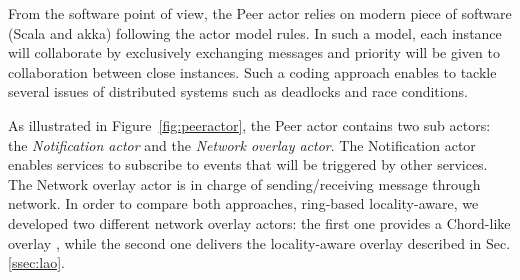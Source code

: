 From the software point of view, the Peer actor relies on modern piece of software (Scala
and akka) following the actor model rules. In such a model, each instance will
collaborate by exclusively exchanging messages and priority will be given to collaboration
between close instances. Such a coding approach enables to tackle several issues of
distributed systems such as deadlocks and race conditions.

%

As illustrated in Figure~\ref {fig:peeractor}, the Peer actor contains two sub actors: the
\emph{Notification actor} and the \emph{Network overlay actor}. The Notification actor
enables services to subscribe to events that will be triggered by other services. The
Network overlay actor is in charge of sending/receiving message through network. In order
to compare both approaches, ring-based \vs locality-aware, we developed two different
network overlay actors: the first one provides a Chord-like overlay
\cite{stoica2001chord}, while the second one delivers the locality-aware overlay described
in Sec. \ref{ssec:lao}.

